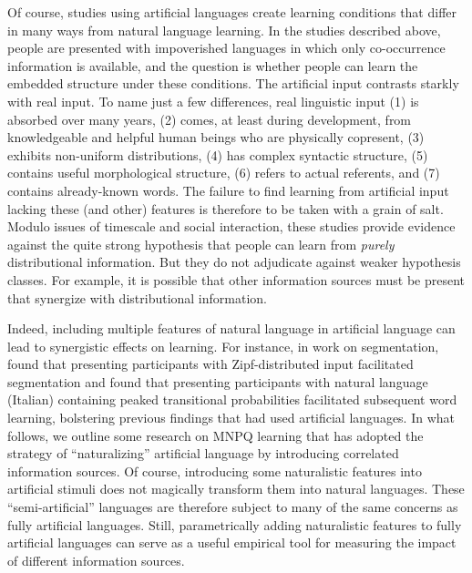 \documentclass[man,longtable,floatsintext]{my-apa6}
\begin{document}
Of course, studies using artificial languages create learning conditions that differ in many ways from natural language learning.
In the studies described above, people are presented with impoverished languages in which only co-occurrence information is available, and the question is whether people can learn the embedded structure under these conditions.
The artificial input contrasts starkly with real input.
To name just a few differences, real linguistic input (1) is absorbed over many years, (2) comes, at least during development, from knowledgeable and helpful human beings who are physically copresent, (3) exhibits non-uniform distributions, (4) has complex syntactic structure, (5) contains useful morphological structure, (6) refers to actual referents, and (7) contains already-known words.
The failure to find learning from artificial input lacking these (and other) features is therefore to be taken with a grain of salt.
Modulo issues of timescale and social interaction, these studies provide evidence against the quite strong hypothesis that people can learn from \emph{purely} distributional information.
But they do not adjudicate against weaker hypothesis classes.
For example, it is possible that other information sources must be present that synergize with distributional information.

Indeed, including multiple features of natural language in artificial language can lead to synergistic effects on learning.
For instance, in work on segmentation, \citet{kurumada13} found that presenting participants with Zipf-distributed input facilitated segmentation and \citet{hay11} found that presenting participants with natural language (Italian) containing peaked transitional probabilities facilitated subsequent word learning, bolstering previous findings that had used artificial languages.
In what follows, we outline some research on MNPQ learning that has adopted the strategy of ``naturalizing'' artificial language by introducing correlated information sources.
Of course, introducing some naturalistic features into artificial stimuli does not magically transform them into natural languages.
These ``semi-artificial'' languages are therefore subject to many of the same concerns as fully artificial languages.
Still, parametrically adding naturalistic features to fully artificial languages can serve as a useful empirical tool for measuring the impact of different information sources.
\end{document}
